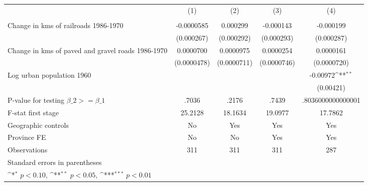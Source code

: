 {
\def\sym#1{\ifmmode^{#1}\else\(^{#1}\)\fi}
\begin{tabular}{l*{4}{c}}
\hline\hline
                &\multicolumn{1}{c}{(1)}&\multicolumn{1}{c}{(2)}&\multicolumn{1}{c}{(3)}&\multicolumn{1}{c}{(4)}\\
                &\multicolumn{1}{c}{}&\multicolumn{1}{c}{}&\multicolumn{1}{c}{}&\multicolumn{1}{c}{}\\
\hline
Change in kms of railroads 1986-1970&-0.0000585         & 0.000299         &-0.000143         &-0.000199         \\
                &(0.000267)         &(0.000292)         &(0.000293)         &(0.000287)         \\
[1em]
Change in kms of paved and gravel roads 1986-1970&0.0000700         &0.0000975         &0.0000254         &0.0000161         \\
                &(0.0000478)         &(0.0000711)         &(0.0000746)         &(0.0000720)         \\
[1em]
Log urban population 1960&                  &                  &                  & -0.00972\sym{**} \\
                &                  &                  &                  &(0.00421)         \\
\hline
P-value for testing $\beta\_{2} >= \beta\_{1}$&    .7036         &    .2176         &    .7439         &.8036000000000001         \\
F-stat first stage&  25.2128         &  18.1634         &  19.0977         &  17.7862         \\
Geographic controls&       No         &      Yes         &      Yes         &      Yes         \\
Province FE     &       No         &       No         &      Yes         &      Yes         \\
Observations    &      311         &      311         &      311         &      287         \\
\hline\hline
\multicolumn{5}{l}{\footnotesize Standard errors in parentheses}\\
\multicolumn{5}{l}{\footnotesize \sym{*} \(p<0.10\), \sym{**} \(p<0.05\), \sym{***} \(p<0.01\)}\\
\end{tabular}
}

